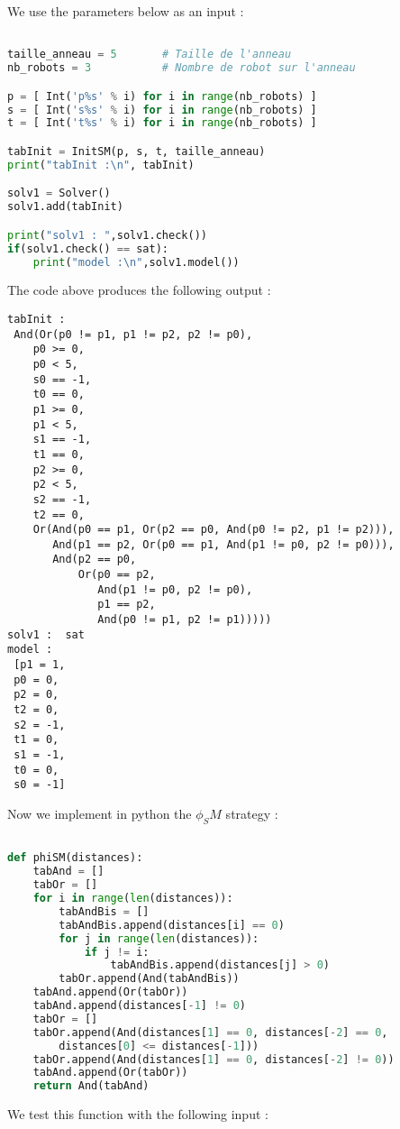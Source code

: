 \documentclass{article}
\begin{document}
We use the parameters below as an input :
\begin{lstlisting}[language=Python]

taille_anneau = 5       # Taille de l'anneau 
nb_robots = 3           # Nombre de robot sur l'anneau

p = [ Int('p%s' % i) for i in range(nb_robots) ]
s = [ Int('s%s' % i) for i in range(nb_robots) ]
t = [ Int('t%s' % i) for i in range(nb_robots) ]

tabInit = InitSM(p, s, t, taille_anneau)
print("tabInit :\n", tabInit)

solv1 = Solver()
solv1.add(tabInit)

print("solv1 : ",solv1.check())
if(solv1.check() == sat):
    print("model :\n",solv1.model())
\end{lstlisting}
The code above produces the following output : 
\begin{lstlisting}
tabInit :
 And(Or(p0 != p1, p1 != p2, p2 != p0),
    p0 >= 0,
    p0 < 5,
    s0 == -1,
    t0 == 0,
    p1 >= 0,
    p1 < 5,
    s1 == -1,
    t1 == 0,
    p2 >= 0,
    p2 < 5,
    s2 == -1,
    t2 == 0,
    Or(And(p0 == p1, Or(p2 == p0, And(p0 != p2, p1 != p2))),
       And(p1 == p2, Or(p0 == p1, And(p1 != p0, p2 != p0))),
       And(p2 == p0,
           Or(p0 == p2,
              And(p1 != p0, p2 != p0),
              p1 == p2,
              And(p0 != p1, p2 != p1)))))
solv1 :  sat
model :
 [p1 = 1,
 p0 = 0,
 p2 = 0,
 t2 = 0,
 s2 = -1,
 t1 = 0,
 s1 = -1,
 t0 = 0,
 s0 = -1]
\end{lstlisting}

Now we implement in python the $\phi_SM$ strategy :

\begin{lstlisting}[language=Python]

def phiSM(distances):
    tabAnd = []
    tabOr = []
    for i in range(len(distances)):
        tabAndBis = []
        tabAndBis.append(distances[i] == 0)
        for j in range(len(distances)):
            if j != i:
                tabAndBis.append(distances[j] > 0)
        tabOr.append(And(tabAndBis))
    tabAnd.append(Or(tabOr))
    tabAnd.append(distances[-1] != 0)
    tabOr = []
    tabOr.append(And(distances[1] == 0, distances[-2] == 0,
        distances[0] <= distances[-1]))
    tabOr.append(And(distances[1] == 0, distances[-2] != 0))
    tabAnd.append(Or(tabOr))
    return And(tabAnd)
\end{lstlisting}

We test this function with the following input :
\end{document}
